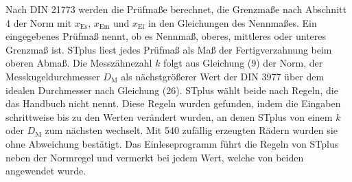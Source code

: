 Nach DIN 21773 werden die Prüfmaße berechnet, die Grenzmaße nach Abschnitt 4 der Norm mit $x_{\mathrm{Es}}$, $x_{\mathrm{Em}}$ und $x_{\mathrm{Ei}}$ in den Gleichungen des Nennmaßes. Ein eingegebenes Prüfmaß nennt, ob es Nennmaß, oberes, mittleres oder unteres Grenzmaß ist. STplus liest jedes Prüfmaß als Maß der Fertigverzahnung beim oberen Abmaß. Die Messzähnezahl $k$ folgt aus Gleichung (9) der Norm, der Messkugeldurchmesser $D_{\mathrm{M}}$ als nächstgrößerer Wert der DIN 3977 \cite[Tabelle 1, S.~2]{DIN3977} über dem idealen Durchmesser nach Gleichung (26). STplus wählt beide nach Regeln, die das Handbuch nicht nennt. Diese Regeln wurden gefunden, indem die Eingaben schrittweise bis zu den Werten verändert wurden, an denen STplus von einem $k$ oder $D_{\mathrm{M}}$ zum nächsten wechselt. Mit 540 zufällig erzeugten Rädern wurden sie ohne Abweichung bestätigt. Das Einleseprogramm führt die Regeln von STplus neben der Normregel und vermerkt bei jedem Wert, welche von beiden angewendet wurde.


